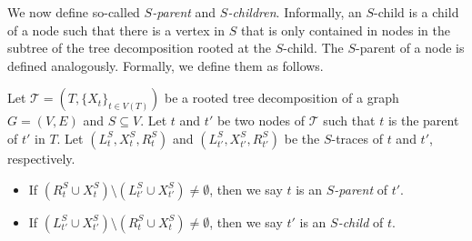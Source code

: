 \documentclass[a4paper,UKenglish,cleveref, autoref, thm-restate, numberwithinsect]{lipics-v2021}
\begin{document}
We now define so-called \emph{$S$-parent} and \emph{$S$-children}. Informally, an $S$-child is a child of a node such that there is a vertex in $S$ that is only contained in nodes in the subtree of the tree decomposition rooted at the $S$-child. The $S$-parent of a node is defined analogously. Formally, we define them as follows.

\begin{definition}\label{def:sparentchild}
Let $\mathcal{T}=(T,\{X_t\}_{t\in V(T)})$ be a rooted tree decomposition of a graph $G=(V,E)$ and $S\subseteq V$.
Let $t$ and $t'$ be two nodes of $\mathcal{T}$ such that $t$ is the parent of $t'$ in $T$. Let $(L_t^S, X_t^S, R_t^S)$ and $(L_{t'}^S, X_{t'}^S, R_{t'}^S)$ be the $S$-traces of $t$ and $t'$, respectively.
    \begin{itemize}
        \item If $(R_t^S \cup X_t^S)\setminus (L_{t'}^S \cup X_{t'}^S)\neq \emptyset$, then we say $t$ is an \emph{$S$-parent} of $t'$. 
        \item If $(L_{t'}^S \cup X_{t'}^S)\setminus (R_t^S \cup X_t^S) \neq \emptyset$, then we say $t'$ is an \emph{$S$-child} of $t$. 
    \end{itemize}
\end{definition}
\end{document}
